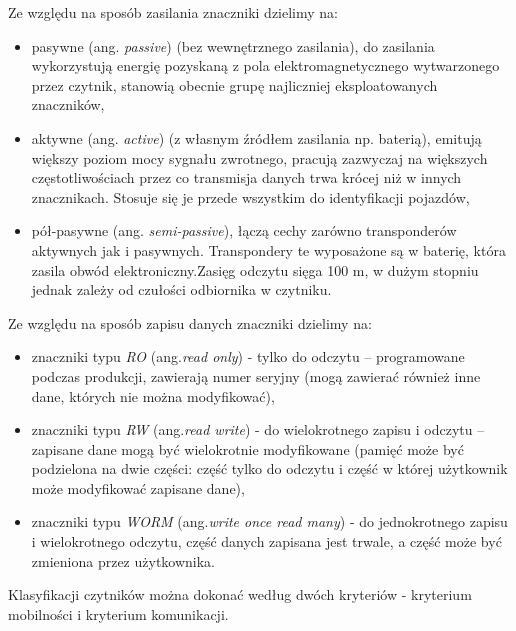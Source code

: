 \noindent 
Ze względu na sposób zasilania znaczniki dzielimy na: 
\begin{itemize}\setlength{\itemsep}{0pt}

	\item pasywne  (ang. \emph{passive}) (bez wewnętrznego zasilania), do zasilania  wykorzystują energię pozyskaną z pola elektromagnetycznego wytwarzonego przez czytnik, stanowią obecnie grupę najliczniej eksploatowanych znaczników, 

	\item aktywne (ang. \emph{active}) (z własnym źródłem zasilania np. baterią), emitują większy poziom mocy sygnału zwrotnego, pracują zazwyczaj na większych częstotliwościach przez co transmisja danych trwa krócej niż w innych znacznikach. Stosuje się je przede wszystkim do identyfikacji pojazdów,
	
	\item pół-pasywne (ang. \emph{semi-passive}), łączą cechy zarówno transponderów aktywnych jak i pasywnych. Transpondery te wyposażone są w baterię, która zasila obwód elektroniczny.Zasięg odczytu sięga 100 m, w dużym stopniu jednak zależy od czułości odbiornika w czytniku.  

\end{itemize}

\noindent 
\newline Ze względu na sposób zapisu danych znaczniki dzielimy na:
\begin{itemize}\setlength{\itemsep}{0pt}

	\item znaczniki typu \emph{RO} (ang.\emph{read only}) - tylko do odczytu – programowane podczas produkcji, zawierają numer seryjny (mogą zawierać również inne dane, których nie można modyfikować), 

	\item znaczniki typu \emph{RW} (ang.\emph{read write}) - do wielokrotnego zapisu i odczytu – zapisane dane mogą być wielokrotnie modyfikowane (pamięć może być podzielona na dwie części: część tylko do odczytu i część w której użytkownik może modyfikować zapisane dane),

	\item znaczniki typu \emph{WORM} (ang.\emph{write once read many}) - do jednokrotnego zapisu i wielokrotnego odczytu, część danych zapisana jest trwale, a część może być zmieniona przez użytkownika.

\end{itemize}


\noindent 
\newline Klasyfikacji czytników można dokonać według dwóch kryteriów - kryterium mobilności i kryterium komunikacji.



